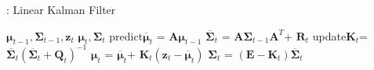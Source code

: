 \documentclass{article}
\begin{document}
\begin{CJK*}{GBK}{song}
\begin{algorithm}[h]
    \caption{: Linear Kalman Filter}
    \begin{algorithmic}[1] %
        \Require ${\boldsymbol{\mu}_{t-1}}, {\boldsymbol{\Sigma}_{t-1}},{\boldsymbol{z}_{t}}$
        \Ensure ${\boldsymbol{\mu}_t}, {\boldsymbol{\Sigma}_t}$
            \State predict\quad$\overline{{\boldsymbol{\mu}}}_{t}$  = ${\boldsymbol{A}}{\boldsymbol{\mu}_{t-1}}$
            \State \qquad\qquad$\overline{{\boldsymbol{\Sigma}}}_{t}$  = ${\boldsymbol{A}}{\boldsymbol{\Sigma}_{t-1}}{\boldsymbol{A}}^T$+ $\boldsymbol{R}_t$
            \State update\quad$\boldsymbol{K}_t$=$\overline{{\boldsymbol{\Sigma}}}_{t}(\overline{{\boldsymbol{\Sigma}}}_{t}+
            \boldsymbol{Q}_t)^{-1}$
            \State\qquad\qquad ${{\boldsymbol{\mu}}}_{t}$  = $\overline{{\boldsymbol{\mu}}}_{t}$+
            $\boldsymbol{K}_t({\boldsymbol{z}_{t}}-\overline{{\boldsymbol{\mu}}}_{t})$
            \State \qquad\qquad${{\boldsymbol{\Sigma}}}_{t}$  =
            $(\boldsymbol{E} - \boldsymbol{K}_t)\overline{{\boldsymbol{\Sigma}}}_{t}$
        \EndFunction
    \end{algorithmic}
\end{algorithm}



\end{CJK*}
\end{document}
